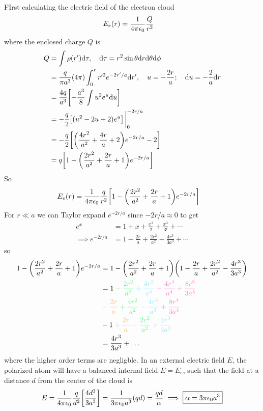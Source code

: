 \documentclass[../main.tex]{subfiles}
\begin{document}
FIrst calculating the electric field of the electron cloud
\begin{align*}
    E_e (r) &= \frac{1}{4\pi\epsilon_0} \frac{Q}{r^2}
\end{align*}
where the enclosed charge $Q$ is
\begin{align*}
    Q &= \int \rho(r') \dd \tau, \quad \dd\tau = r^2 \sin\theta \dd r \dd\theta \dd\phi \\
    &= \frac{q}{\pi a^3} (4\pi) \int_0^r r'^2 e^{-2r'/a} \dd r', \quad u = -\frac{2r}{a};\quad \dd u = -\frac{2}{a} \dd r \\
    &= \frac{4q}{a^3} \qt[
        -\frac{a^3}{8} \int u^2 e^u \dd u
    ] \\
    &= -\frac{q}{2} \qt[
        (u^2 - 2u + 2) e^u
    ]\eval_0^{-2r/a} \\
    &= -\frac{q}{2} \qt[
        \qt(\frac{4r^2}{a^2} + \frac{4r}{a} + 2) e^{-2r/a} - 2
    ] \\
    &= q \qt[
        1 - \qt(\frac{2r^2}{a^2} + \frac{2r}{a} + 1) e^{-2r/a}
    ]
\end{align*}
So
\begin{align*}
    E_e(r) &= \ke \frac{q}{r^2} \qt[
        1 - \qt(\frac{2r^2}{a^2} + \frac{2r}{a} + 1) e^{-2r/a}
    ]
\end{align*}
For $r \ll a$ we can Taylor expand $e^{-2r/a}$ since $-2r/a \approx 0$ to get
\begin{align*}
    e^x &= 1 + x + \frac{x^2}{2} + \frac{x^3}{3!} + \cdots \\
    \implies e^{-2r/a} &= 1 - \frac{2r}{a} + \frac{2r^2}{a^2} - \frac{4r^3}{3a^3} + \cdots
\end{align*}
so
\begin{align*}
    1 - \qt(\frac{2r^2}{a^2} + \frac{2r}{a} + 1) e^{-2r/a} &= 1 - \qt(\frac{2r^2}{a^2} + \frac{2r}{a} + 1) \qt(1 - \frac{2r}{a} + \frac{2r^2}{a^2} - \frac{4r^3}{3a^3}) \\
    &= 1 \color{draculagreen} - \frac{2r^2}{a^2} \color{draculacyan} + \frac{4r^3}{a^3} \color{draculapink} - \frac{4r^4}{a^4} + \frac{8r^5}{3a^5} \\
    & \color{draculaorange} - \frac{2r}{a} \color{draculagreen} + \frac{4r^2}{a^2} \color{draculacyan} - \frac{4r^3}{a^3} \color{draculapink} + \frac{8r^4}{3a^4} \\
    & -1 \color{draculaorange} + \frac{2r}{a} \color{draculagreen} - \frac{2r^2}{a^2} \color{draculacyan} + \frac{4r^3}{3a^3} \\
    &= \frac{4r^3}{3a^3} + \dots
\end{align*}
where the higher order terms are negligble. In an external electric field $E$, the polarized atom will have a balanced internal field $E = E_e$,
such that the field at a distance $d$ from the center of the cloud is
\begin{align*}
    E = \ke \frac{q}{d^2} \qt[
        \frac{4d^3}{3a^3}
    ] = \frac{1}{3\pi\epsilon_0 a^3} (qd) = \frac{qd}{\alpha} \implies 
    \boxed{
        \alpha = 3\pi\epsilon_0 a^3
    }
\end{align*}
\end{document}
